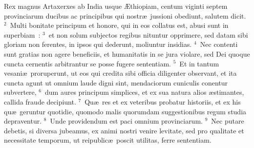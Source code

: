 \lettrine[lines=10,image=true,loversize=0.05,lraise=-0.03]{R}{}ex magnus Artaxerxes ab India usque \AE thiopiam, centum viginti septem provinciarum ducibus ac principibus qui nostr\ae\ jussioni obediunt, salutem dicit.
${}^{2}$~Multi bonitate principum et honore, qui in eos collatus est, abusi sunt in superbiam~:
${}^{3}$~et non solum subjectos regibus nituntur opprimere, sed datam sibi gloriam non ferentes, in ipsos qui dederunt, moliuntur insidias.
${}^{4}$~Nec contenti sunt gratias non agere beneficiis, et humanitatis in se jura violare, sed Dei quoque cuncta cernentis arbitrantur se posse fugere sententiam.
${}^{5}$~Et in tantum vesani\ae\ proruperunt, ut eos qui credita sibi officia diligenter observant, et ita cuncta agunt ut omnium laude digni sint, mendaciorum cuniculis conentur subvertere,
${}^{6}$~dum aures principum simplices, et ex sua natura alios \ae stimantes, callida fraude decipiunt.
${}^{7}$~Qu\ae\ res et ex veteribus probatur historiis, et ex his qu\ae\ geruntur quotidie, quomodo malis quorumdam suggestionibus regum studia depraventur.
${}^{8}$~Unde providendum est paci omnium provinciarum.
${}^{9}$~Nec putare debetis, si diversa jubeamus, ex animi nostri venire levitate, sed pro qualitate et necessitate temporum, ut reipublic\ae\ poscit utilitas, ferre sententiam.


